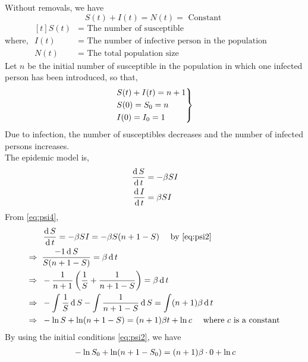 \documentclass[../main-sheet.tex]{subfiles}
\begin{document}
\begin{soln}
    Without removals, we have\
    \begin{equation}
        S(t)+I(t)=N(t)=\text{ Constant }
        \label{eq:psi1}
    \end{equation}
    where, \(\begin{aligned}[t]
        S(t)&=\text{ The number of susceptible}\\
        I(t)&=\text{ The number of infective person in the population}\\
        N(t)&=\text{ The total population size}
    \end{aligned}\)\\
    Let \(n\) be the initial number of susceptible in the population in which one infected person has been introduced, so that,
    \begin{equation}
        \begin{rcases}
            S(t)+I(t)=n+1\\    
            S(0)=S_0=n\\    
            I(0)=I_0=1    
        \end{rcases}
        \label{eq:psi2}
    \end{equation}
    Due to infection, the number of susceptibles decreases and the number of infected persons increases.\\
    The epidemic model is,
    \begin{align}
        \,\frac{\mathrm{d}\,S}{\mathrm{d}\,t}&=-\beta SI\label{eq:psi3}\\
        \,\frac{\mathrm{d}\,I}{\mathrm{d}\,t}&=\beta SI\label{eq:psi4}
    \end{align}
    From \eqref{eq:psi4},
    \begin{align}
        & \,\frac{\mathrm{d}\,S}{\mathrm{d}\,t}=-\beta SI=-\beta S(n+1-S) \quad\text{ by \eqref{eq:psi2}}\notag\\
        \Rightarrow\;\;& \frac{-1 \,\mathrm{d}\, S}{S(n+1-S)}=\beta \,\mathrm{d}\, t\notag\\
        \Rightarrow\;\;& -\frac{1 }{n+1}\left( \frac{1}{S}+\frac{1}{n+1-S} \right)=\beta \,\mathrm{d}\, t\notag\\
        \Rightarrow\;\;& -\int \frac{1 }{S}\,\mathrm{d}\, S-\int \frac{1}{n+1-S} \,\mathrm{d}\, S=\int(n+1)\beta \,\mathrm{d}\, t\notag\\
        \Rightarrow\;\;& -\ln{S}+\ln({n+1-S})=(n+1)\beta t+\ln c\quad\text{ where \(c\) is a constant}\label{eq:psi5}
    \end{align}
    By using the initial conditions \eqref{eq:psi2}, we have
    \begin{align}
        & -\ln{S_0}+\ln({n+1-S_0})=(n+1)\beta\cdot0+\ln c\notag\\

\end{align}
\end{soln}
\end{document}
